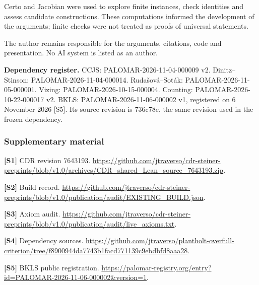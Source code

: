 \documentclass[english,11pt,a4paper]{article}
\begin{document}
Certo and Jacobian were used to explore finite instances, check identities and assess candidate constructions. These computations informed the development of the arguments; finite checks were not treated as proofs of universal statements.

The author remains responsible for the arguments, citations, code and presentation. No AI system is listed as an author.

\textbf{Dependency register.} CCJS: PALOMAR-2026-11-04-000009 v2. Dinitz--Stinson: PALOMAR-2026-11-04-000014. Rudašová--Soták: PALOMAR-2026-11-05-000001. Vizing: PALOMAR-2026-10-15-000004. Counting: PALOMAR-2026-10-22-000017 v2. BKLS: PALOMAR-2026-11-06-000002 v1, registered on 6 November 2026 {[}S5{]}. Its source revision is 736c78e, the same revision used in the frozen dependency.

\subsubsection{Supplementary material}\label{supplementary-material}

\textbf{{[}S1{]}} CDR revision 7643193. \url{https://github.com/jtraverso/cdr-steiner-preprints/blob/v1.0/archives/CDR_shared_Lean_source_7643193.zip}.

\textbf{{[}S2{]}} Build record. \url{https://github.com/jtraverso/cdr-steiner-preprints/blob/v1.0/publication/audit/EXISTING_BUILD.json}.

\textbf{{[}S3{]}} Axiom audit. \url{https://github.com/jtraverso/cdr-steiner-preprints/blob/v1.0/publication/audit/live_axioms.txt}.

\textbf{{[}S4{]}} Dependency sources. \url{https://github.com/jtraverso/plantholt-overfull-criterion/tree/f8900944da7743b1facd771139c9ebdbfd8aaa28}.

\textbf{{[}S5{]}} BKLS public registration. \url{https://palomar-registry.org/entry?id=PALOMAR-2026-11-06-000002&version=1}.
\end{document}
